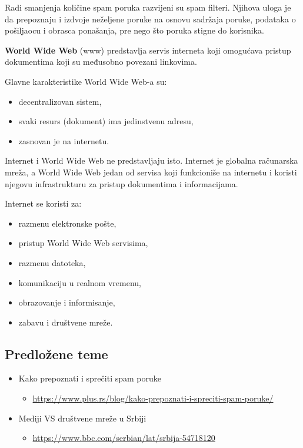 \documentclass[a4paper, 12pt]{article}
\begin{document}
Radi smanjenja količine spam poruka razvijeni su spam filteri. Njihova uloga je da
prepoznaju i izdvoje neželjene poruke na osnovu sadržaja poruke, podataka o
pošiljaocu i obrasca ponašanja, pre nego što poruka stigne do korisnika.

\vspace{\baselineskip}

\textbf{World Wide Web} (www) predstavlja servis interneta koji omogućava pristup dokumentima koji su međusobno povezani linkovima. 

Glavne karakteristike World Wide Web-a su:
\begin{itemize}
    \item decentralizovan sistem,
    \item svaki resurs (dokument) ima jedinstvenu adresu,
    \item zasnovan je na internetu.
\end{itemize}

Internet i World Wide Web ne predstavljaju isto. Internet je globalna računarska mreža, a World Wide Web jedan od servisa koji funkcioniše na internetu i koristi njegovu
infrastrukturu za pristup dokumentima i informacijama.

Internet se koristi za:
\begin{itemize}
    \item razmenu elektronske pošte,
    \item pristup World Wide Web servisima,
    \item razmenu datoteka,
    \item komunikaciju u realnom vremenu,
    \item obrazovanje i informisanje,
    \item zabavu i društvene mreže.
\end{itemize}
\subsection{Predložene teme}

\begin{itemize}
    \item Kako prepoznati i sprečiti spam poruke
    \begin{itemize}
        \item \url{https://www.plus.rs/blog/kako-prepoznati-i-spreciti-spam-poruke/}
    \end{itemize}
    \item Mediji VS društvene mreže u Srbiji
    \begin{itemize}
        \item \url{https://www.bbc.com/serbian/lat/srbija-54718120}
    \end{itemize}
    
\end{itemize}
\end{document}
